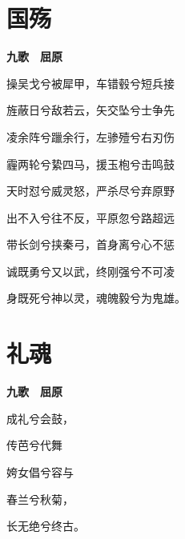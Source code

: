 \documentclass[12pt,a4paper]{ctexbook}
\begin{document}
\section{国殇}
\textbf{九歌　屈原}\par\vspace{0.5em}
操吴戈兮被犀甲，车错毂兮短兵接\par
旌蔽日兮敌若云，矢交坠兮士争先\par
凌余阵兮躐余行，左骖殪兮右刃伤\par
霾两轮兮絷四马，援玉枹兮击鸣鼓\par
天时怼兮威灵怒，严杀尽兮弃原野\par
出不入兮往不反，平原忽兮路超远\par
带长剑兮挟秦弓，首身离兮心不惩\par
诚既勇兮又以武，终刚强兮不可凌\par
身既死兮神以灵，魂魄毅兮为鬼雄。\par

\section{礼魂}
\textbf{九歌　屈原}\par\vspace{0.5em}
成礼兮会鼓，\par
传芭兮代舞\par
姱女倡兮容与\par
春兰兮秋菊，\par
长无绝兮终古。\par
\end{document}
